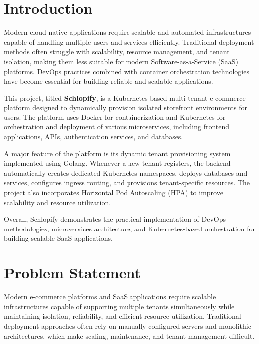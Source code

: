 \documentclass[12pt,a4paper]{report}
\begin{document}
\chapter{Introduction}

Modern cloud-native applications require scalable and automated infrastructures capable of handling multiple users and services efficiently. Traditional deployment methods often struggle with scalability, resource management, and tenant isolation, making them less suitable for modern Software-as-a-Service (SaaS) platforms. DevOps practices combined with container orchestration technologies have become essential for building reliable and scalable applications.

This project, titled \textbf{Schlopify}, is a Kubernetes-based multi-tenant e-commerce platform designed to dynamically provision isolated storefront environments for users. The platform uses Docker for containerization and Kubernetes for orchestration and deployment of various microservices, including frontend applications, APIs, authentication services, and databases.

A major feature of the platform is its dynamic tenant provisioning system implemented using Golang. Whenever a new tenant registers, the backend automatically creates dedicated Kubernetes namespaces, deploys databases and services, configures ingress routing, and provisions tenant-specific resources. The project also incorporates Horizontal Pod Autoscaling (HPA) to improve scalability and resource utilization.

Overall, Schlopify demonstrates the practical implementation of DevOps methodologies, microservices architecture, and Kubernetes-based orchestration for building scalable SaaS applications.

\newpage












\chapter{Problem Statement}

Modern e-commerce platforms and SaaS applications require scalable infrastructures capable of supporting multiple tenants simultaneously while maintaining isolation, reliability, and efficient resource utilization. Traditional deployment approaches often rely on manually configured servers and monolithic architectures, which make scaling, maintenance, and tenant management difficult.
\end{document}
